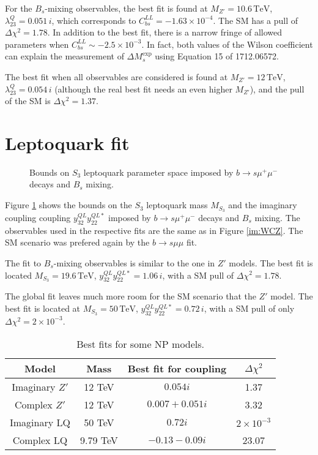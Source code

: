 \documentclass[11pt, a4paper]{article}
\begin{document}
For the $B_s$-mixing observables, the best fit is found at $M_{Z'}= 10.6\,\mathrm{TeV}$, $\lambda_{23}^Q = 0.051\,i$, which corresponds to $C_{bs}^{LL}= -1.63\times 10^{-4}$. The SM has a pull of $\Delta \chi^2 = 1.78$. In addition to the best fit, there is a narrow fringe of allowed parameters when $C_{bs}^{LL} \sim - 2.5\times 10^{-3}$. In fact, both values of the Wilson coefficient can explain the measurement of $\Delta M_s^{\mathrm{exp}}$ using Equation 15 of 1712.06572.

The best fit when all observables are considered is found at $M_{Z'} = 12\, \mathrm{TeV}$, $\lambda_{23}^Q = 0.054\,i$ (although the real best fit needs an even higher $M_{Z'}$), and the pull of the SM is $\Delta \chi^2 = 1.37$.  
\section{Leptoquark fit}
\begin{figure}[H]
\centering
\resizebox{0.6\textwidth}{!}{}
\caption{Bounds on $S_3$ leptoquark parameter space imposed by $b\to s \mu^+ \mu^-$ decays and $B_s$ mixing.}\label{im:WCLQ}
\end{figure}

Figure \ref{im:WCLQ} shows the bounds on the $S_3$ leptoquark mass $M_{S_3}$ and the imaginary coupling coupling $y^{QL}_{32} y^{QL*}_{22}$  imposed by $b\to s \mu^+ \mu^-$ decays and $B_s$ mixing. The observables used in the respective fits are the same as in Figure \ref{im:WCZ}. The SM scenario was prefered again by the $b\to s\mu\mu$ fit.

The fit to $B_s$-mixing observables is similar to the one in $Z'$ models. The best fit is located $M_{S_3}= 19.6\,\mathrm{TeV}$, $y_{32}^{QL} y_{22}^{QL*} = 1.06\,i$, with a SM pull of $\Delta\chi^2 = 1.78$. 

The global fit leaves much more room for the SM scenario that the $Z'$ model. The best fit is located at $M_{S_3} = 50\,\mathrm{TeV}$, $y_{32}^{QL} y_{22}^{QL*} = 0.72\,i$, with a SM pull of only $\Delta\chi^2 = 2\times10^{-3}$.

\begin{table}[H]
\centering
\begin{tabular}{|c|c|c|c|}\hline
Model & Mass & Best fit for coupling & $\Delta \chi^2$ \\\hline
Imaginary $Z'$ & 12 TeV & $0.054i$ & 1.37 \\\hline
Complex $Z'$ & 12 TeV & $0.007 + 0.051i$ & 3.32 \\\hline
Imaginary LQ & 50 TeV & $0.72i$ & $2\times 10^{-3}$ \\\hline
Complex LQ & 9.79 TeV & $-0.13-0.09i$ & 23.07 \\\hline

\end{tabular}
\caption{Best fits for some NP models.}
\end{table}
\end{document}
